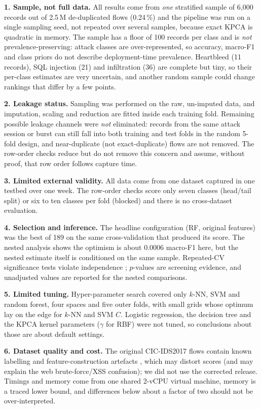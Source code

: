 \documentclass[runningheads]{llncs}
\begin{document}
\textbf{1. Sample, not full data.} All results come from \emph{one} stratified sample of 6{,}000 records out of 2.5\,M de-duplicated flows (0.24\,\%) and the pipeline was run on a single sampling seed, not repeated over several samples, because exact KPCA is quadratic in memory. The sample has a floor of 100 records per class and is \emph{not} prevalence-preserving: attack classes are over-represented, so accuracy, macro-F1 and class priors do not describe deployment-time prevalence. Heartbleed (11 records), SQL injection (21) and infiltration (36) are complete but tiny, so their per-class estimates are very uncertain, and another random sample could change rankings that differ by a few points.

\textbf{2. Leakage status.} Sampling was performed on the raw, un-imputed data, and imputation, scaling and reduction are fitted inside each training fold. Remaining possible leakage channels were \emph{not} eliminated: records from the same attack session or burst can still fall into both training and test folds in the random 5-fold design, and near-duplicate (not exact-duplicate) flows are not removed. The row-order checks reduce but do not remove this concern and assume, without proof, that row order follows capture time.

\textbf{3. Limited external validity.} All data come from one dataset captured in one testbed over one week. The row-order checks score only seven classes (head/tail split) or six to ten classes per fold (blocked) and there is no cross-dataset evaluation.

\textbf{4. Selection and inference.} The headline configuration (RF, original features) was the best of 189 on the same cross-validation that produced its score. The nested analysis shows the optimism is about 0.0006 macro-F1 here, but the nested estimate itself is conditioned on the same sample. Repeated-CV significance tests violate independence \cite{nadeau2003}; $p$-values are screening evidence, and unadjusted values are reported for the nested comparisons.

\textbf{5. Limited tuning.} Hyper-parameter search covered only $k$-NN, SVM and random forest, four spaces and five outer folds, with small grids whose optimum lay on the edge for $k$-NN and SVM $C$. Logistic regression, the decision tree and the KPCA kernel parameters ($\gamma$ for RBF) were not tuned, so conclusions about those are about default settings.

\textbf{6. Dataset quality and cost.} The original CIC-IDS2017 flows contain known labelling and feature-construction artefacts \cite{engelen2021}, which may distort scores (and may explain the web brute-force/XSS confusion); we did not use the corrected release. Timings and memory come from one shared 2-vCPU virtual machine, memory is a traced lower bound, and differences below about a factor of two should not be over-interpreted.
\end{document}

